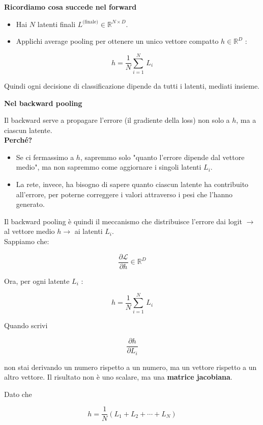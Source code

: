 \documentclass[
  11pt,
]{article}
\begin{document}
\[\ \]

\textbf{Ricordiamo cosa succede nel forward}

\begin{itemize}
\item
  Hai \(N\) latenti finali
  \(L^{\text{(finale)}} \in \mathbb{R}^{N \times D}\).
\item
  Applichi average pooling per ottenere un unico vettore compatto
  \(h \in \mathbb{R}^{D}\) :
\end{itemize}


\[h = \frac{1}{N}\sum_{i = 1}^{N}\, L_{i}\]


Quindi ogni decisione di classificazione dipende da tutti i latenti,
mediati insieme.

\textbf{Nel backward pooling}

Il backward serve a propagare l'errore (il gradiente
della loss) non solo a \(h\), ma a ciascun latente.\\
\textbf{Perché?}

\begin{itemize}
\item
  Se ci fermassimo a \(h\), sapremmo solo "quanto
  l'errore dipende dal vettore medio", ma non sapremmo
  come aggiornare i singoli latenti \(L_{i}\).
\item
  La rete, invece, ha bisogno di sapere quanto ciascun latente ha
  contribuito all'errore, per poterne correggere i
  valori attraverso i pesi che l'hanno generato.
\end{itemize}

Il backward pooling è quindi il meccanismo che distribuisce
l'errore dai logit \(\rightarrow\) al vettore medio
\(h \rightarrow\) ai latenti \(L_{i}\).\\
Sappiamo che:

\[\frac{\partial\mathcal{L}}{\partial h} \in \mathbb{R}^{D}\]

Ora, per ogni latente \(L_{i}\) :

\[h = \frac{1}{N}\sum_{i = 1}^{N}\, L_{i}\]

Quando scrivi

\[\frac{\partial h}{\partial L_{i}}\]

non stai derivando un numero rispetto a un numero, ma un vettore
rispetto a un altro vettore. Il risultato non è uno scalare, ma una
\textbf{matrice jacobiana}.

Dato che

\[h = \frac{1}{N}\left( L_{1} + L_{2} + \cdots + L_{N} \right)\]
\end{document}
